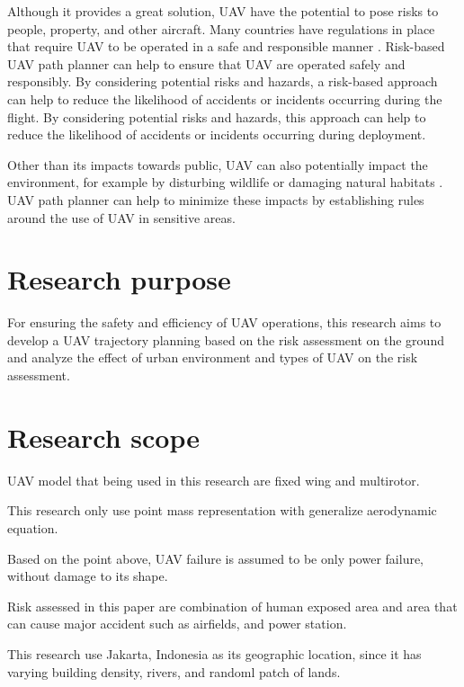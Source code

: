 \documentclass[12pt]{report}
\begin{document}
            Although it provides a great solution, UAV have the potential to pose risks to people, property, and other
        aircraft. Many countries have regulations in place that require UAV to be operated in a safe and responsible
        manner \cite{faa_ecfr_2016}. Risk-based UAV path planner can help to ensure that UAV are operated safely and
        responsibly. By considering potential risks and hazards, a risk-based approach can help to reduce the likelihood
        of accidents or incidents occurring during the flight. By considering potential risks and hazards, this approach
        can help to reduce the likelihood of accidents or incidents occurring during deployment.

            Other than its impacts towards public, UAV can also potentially impact the environment, for example by
        disturbing wildlife or damaging natural habitats \cite{holland_how_2015}. UAV path planner can help to minimize
        these impacts by establishing rules around the use of UAV in sensitive areas.
    \section{Research purpose}
        For ensuring the safety and efficiency of UAV operations, this research aims to develop a UAV trajectory
        planning based on the risk assessment on the ground and analyze the effect of urban environment and types of UAV
        on the risk assessment.
    \section{Research scope}
        \begin{myitemize}   
            \item UAV model that being used in this research are fixed wing and multirotor.
            \item This research only use point mass representation with generalize aerodynamic equation.
            \item Based on the point above, UAV failure is assumed to be only power failure, without damage to its shape.
            \item Risk assessed in this paper are combination of human exposed area and area that can cause major accident such as airfields, and power station.
            \item This research use Jakarta, Indonesia as its geographic location, since it has varying building density, rivers, and randoml patch of lands.
        \end{myitemize}
        
\end{document}
